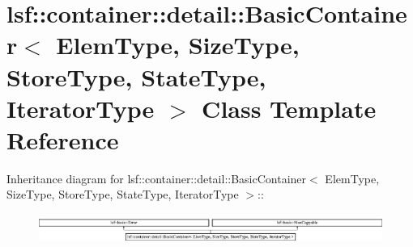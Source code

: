 \hypertarget{classlsf_1_1container_1_1detail_1_1BasicContainer}{
\section{lsf::container::detail::BasicContainer$<$ ElemType, SizeType, StoreType, StateType, IteratorType $>$ Class Template Reference}
\label{classlsf_1_1container_1_1detail_1_1BasicContainer}
}
Inheritance diagram for lsf::container::detail::BasicContainer$<$ ElemType, SizeType, StoreType, StateType, IteratorType $>$::\begin{figure}[H]
\begin{center}
\leavevmode
\includegraphics[height=0.984183cm]{classlsf_1_1container_1_1detail_1_1BasicContainer}
\end{center}
\end{figure}
